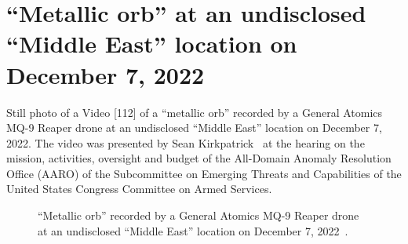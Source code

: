 \clearpage

\section{``Metallic orb'' at an undisclosed ``Middle East'' location on December 7, 2022}
\label{2023-UFO-part-History-photos-2022-AARO--MEO}

Still photo of a Video [112] of a ``metallic orb'' recorded by a General Atomics
MQ-9 Reaper drone at an undisclosed ``Middle East'' location on December 7,
2022.
The video was presented by Sean Kirkpatrick~\cite{Kirkpatrick2023Apr}
at the
hearing on the mission, activities, oversight and budget of the All-Domain Anomaly Resolution Office (AARO)
of the Subcommittee on Emerging Threats and Capabilities
of the United States Congress Committee on Armed Services.


%
\begin{figure}[b]
\sidecaption
%
%
\caption{``Metallic orb'' recorded by a General Atomics MQ-9 Reaper drone at an undisclosed ``Middle East''
location on December 7, 2022~\cite{MiddleEastMetallicOrb_Dec2022}.}

\label{2023-UFO-part-History-photos-2022-AARO--MEO-cu}       %
\end{figure}

